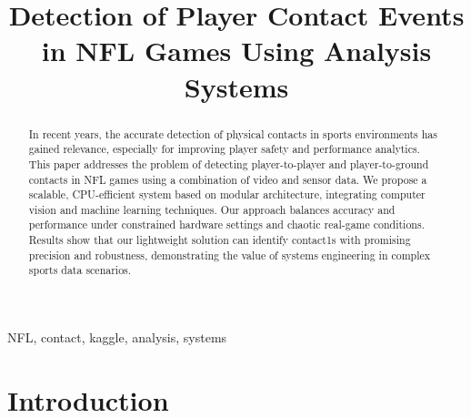 \documentclass[conference]{IEEEtran}
\begin{document}
	
	\title{Detection of Player Contact Events in NFL Games Using Analysis Systems
		\\
	}
	
	\author{
		\and
		\and
	}
	
	\maketitle
	
	\begin{abstract}
		In recent years, the accurate detection of physical contacts in sports environments has gained relevance, especially for improving player safety and performance analytics. This paper addresses the problem of detecting player-to-player and player-to-ground contacts in NFL games using a combination of video and sensor data. We propose a scalable, CPU-efficient system based on modular architecture, integrating computer vision and machine learning techniques. Our approach balances accuracy and performance under constrained hardware settings and chaotic real-game conditions. Results show that our lightweight solution can identify contact1s with promising precision and robustness, demonstrating the value of systems engineering in complex sports data scenarios.
	\end{abstract}
	
	\begin{IEEEkeywords}
		NFL, contact, kaggle, analysis, systems
	\end{IEEEkeywords}
	
	\section{Introduction}
	
\end{document}
